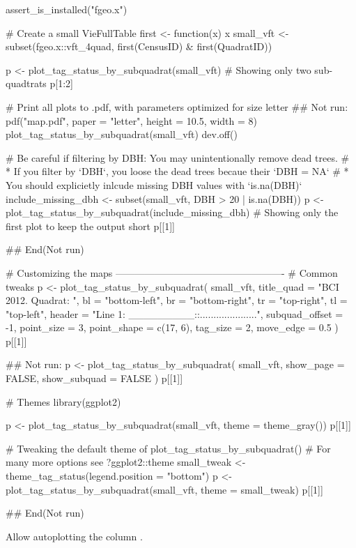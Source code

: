 \documentclass[a4paper]{book}
\begin{document}
\begin{Examples}
\begin{ExampleCode}
assert_is_installed("fgeo.x")

# Create a small VieFullTable
first <- function(x) x %
small_vft <- subset(fgeo.x::vft_4quad, first(CensusID) & first(QuadratID))

p <- plot_tag_status_by_subquadrat(small_vft)
# Showing only two sub-quadtrats
p[1:2]

# Print all plots to .pdf, with parameters optimized for size letter
## Not run: 
pdf("map.pdf", paper = "letter", height = 10.5, width = 8)
plot_tag_status_by_subquadrat(small_vft)
dev.off()

# Be careful if filtering by DBH: You may unintentionally remove dead trees.
# * If you filter by `DBH`, you loose the dead trees becaue their `DBH = NA`
# * You should explicietly inlcude missing DBH values with `is.na(DBH)`
include_missing_dbh <- subset(small_vft, DBH > 20 | is.na(DBH))
p <- plot_tag_status_by_subquadrat(include_missing_dbh)
# Showing only the first plot to keep the output short
p[[1]]

## End(Not run)

# Customizing the maps ----------------------------------------------------
# Common tweaks
p <- plot_tag_status_by_subquadrat(
  small_vft,
  title_quad = "BCI 2012. Quadrat: ",
  bl = "bottom-left", br = "bottom-right", tr = "top-right", tl = "top-left",
  header = "Line 1: _________::.....................",
  subquad_offset = -1,
  point_size = 3, point_shape = c(17, 6),
  tag_size = 2,
  move_edge = 0.5
)
p[[1]]

## Not run: 
p <- plot_tag_status_by_subquadrat(
  small_vft,
  show_page = FALSE,
  show_subquad = FALSE
)
p[[1]]

# Themes
library(ggplot2)

p <- plot_tag_status_by_subquadrat(small_vft, theme = theme_gray())
p[[1]]

# Tweaking the default theme of plot_tag_status_by_subquadrat()
# For many more options see ?ggplot2::theme
small_tweak <- theme_tag_status(legend.position = "bottom")
p <- plot_tag_status_by_subquadrat(small_vft, theme = small_tweak)
p[[1]]

## End(Not run)
\end{ExampleCode}
\end{Examples}
%
\begin{Description}\relax
Allow autoplotting the column .
\end{Description}
\end{document}
